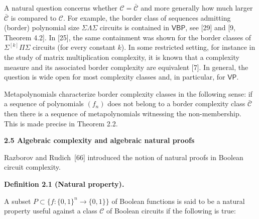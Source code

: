 \documentclass[10pt,a4paper]{article}
\begin{document}
A natural question concerns whether $\mathcal{C}=\bar{\mathcal{C}}$ and more generally how much larger $\bar{\mathcal{C}}$ is compared to $\mathcal{C}$. For example, the border class of sequences admitting (border) polynomial size $\Sigma\Lambda\Sigma$ circuits is contained in $\mathsf{VBP}$, see [29] and [9, Theorem 4.2]. In [25], the same containment was shown for the border classes of $\Sigma^{[k]}\Pi\Sigma$ circuits (for every constant $k$). In some restricted setting, for instance in the study of matrix multiplication complexity, it is known that a complexity measure and its associated border complexity are equivalent [7]. In general, the question is wide open for most complexity classes and, in particular, for $\mathsf{VP}$.





Metapolynomials characterize border complexity classes in the following sense: if a sequence of polynomials $(f_{n})$ does not belong to a border complexity class $\bar{\mathcal{C}}$ then there is a sequence of metapolynomials witnessing the non-membership. This is made precise in Theorem 2.2.






\par\medskip\noindent\textbf{2.5 Algebraic complexity and algebraic natural proofs}\par




Razborov and Rudich [66] introduced the notion of natural proofs in Boolean circuit complexity.





\par\medskip\noindent\textbf{Definition 2.1 (Natural property).}\par



A subset $P\subset\{f:\{0,1\}^{n}\rightarrow\{0,1\}\}$ of Boolean functions is said to be a natural property useful against a class $\mathcal{C}$ of Boolean circuits if the following is true:
\end{document}
